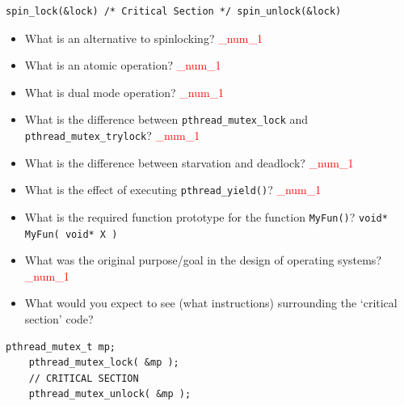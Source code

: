 \documentclass[9pt,landscape]{memoir}
\newcommand{\answer}[1]{\textcolor{red}{_num_1}}
\begin{document}
\begin{multicols}{6}
\begin{lstlisting}[style=cC++,aboveskip=1pt,belowskip=1pt]
    spin_lock(&lock) /* Critical Section */ spin_unlock(&lock)
\end{lstlisting}

\begin{itemize}
    \item What is an alternative to spinlocking?  \answer{Put the process in a wait queue, so it doesn't waste CPU cycles and allow it to sleep until the block is released.}
    \item What is an atomic operation? \answer{An operation that can not have it's execution suspended until it is fully completed. Generally, it is a single operation that can not be interrupted or divided into smaller operations.}
    \item What is dual mode operation? \answer{User mode vs. supervisor mode.}
    \item What is the difference between \verb$pthread_mutex_lock$ and \verb$pthread_mutex_trylock$? \answer{\texttt{pthread\_mutex\_lock} is a blocking call. If we try to lock a mutex that is already locked by some other thread, \texttt{pthread\_mutex\_lock} blocks until the mutex is unlocked. But \texttt{pthread\_mutex\_trylock} is a nonblocking function that returns if the mutex is already locked.}
    \item What is the difference between starvation and deadlock?  \answer{STARVATION: A condition in which a process is indefinitely delayed because other processes are always given preference. DEADLOCK: An impasse that occurs when multiple processes are waiting for the availability of a resource that will not become available because it is being held by another process that is in a similar state.}
    \item What is the effect of executing \verb$pthread_yield()$?  \answer{\texttt{pthread\_yield()}: stop executing the caller thread and yield the CPU to another thread}
    \item What is the required function prototype for the function \verb|MyFun()|? \verb|void* MyFun( void* X )|
    \item What was the original purpose/goal in the design of operating systems? \answer{To increase the efficiency of hardware.}
    \item What would you expect to see (what instructions) surrounding the `critical section' code?
\end{itemize}

\begin{lstlisting}[style=cC++,aboveskip=1pt,belowskip=1pt]
    pthread_mutex_t mp;
    pthread_mutex_lock( &mp );
    // CRITICAL SECTION
    pthread_mutex_unlock( &mp );
\end{lstlisting}




\end{multicols}
\end{document}
